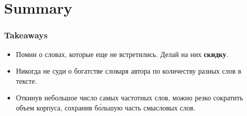 \documentclass[svgnames]{beamer}
\begin{document}
\section*{Summary}

\begin{frame}
  \frametitle{Takeaways}
  \begin{itemize}
  \item Помни о словах, которые еще не встретились. Делай на них
    \textbf{скидку}. 
  \item Никогда не суди о богатстве словаря автора по количеству разных слов в
    тексте. 
  \item Откинув небольшое число самых частотных слов, можно резко
    сократить объем корпуса, сохранив б\'{о}льшую часть смысловых слов.
  \end{itemize}
\end{frame}
\end{document}
